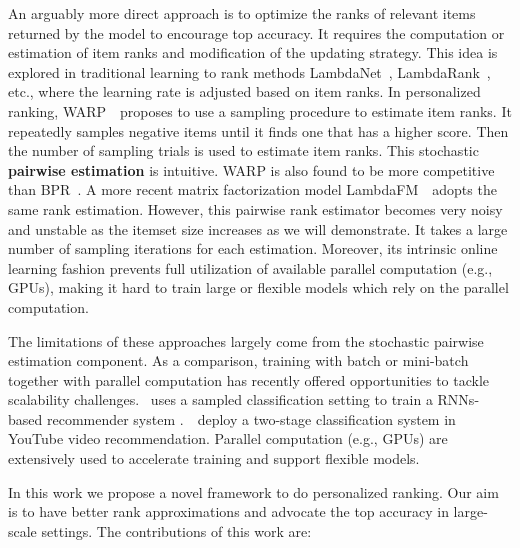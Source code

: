 \documentclass[letterpaper]{article}
\begin{document}
An arguably more direct approach is to optimize the ranks of relevant items returned by the model to encourage top accuracy. It requires the computation or estimation of item ranks and modification of the updating strategy. This idea is explored in traditional learning to rank methods LambdaNet~\cite{burges2005learning}, LambdaRank~\cite{burges2007learning}, etc., where the learning rate is adjusted based on item ranks. In personalized ranking, WARP~\cite{weston2010large}~proposes to use a sampling procedure to estimate item ranks. It repeatedly samples negative items until it finds one that has a higher score. Then the number of sampling trials is used to estimate item ranks. This stochastic \textbf{pairwise estimation} is intuitive. WARP is also found to be more competitive than BPR~\cite{hong2013co}. A more recent matrix factorization model LambdaFM~\cite{yuan2016lambdafm}~adopts the same rank estimation. However, this pairwise rank estimator becomes very noisy and unstable as the itemset size increases as we will demonstrate. It takes a large number of sampling iterations for each estimation. Moreover, its intrinsic online learning fashion prevents full utilization of available parallel computation (e.g., GPUs), making it hard to train large or flexible models which rely on the parallel computation.

The limitations of these approaches largely come from the stochastic pairwise estimation component. As a comparison, training with batch or mini-batch together with parallel computation has recently offered opportunities to tackle scalability challenges. \cite{hidasi2015session}~uses a sampled classification setting to train a RNNs-based recommender system .~\cite{covington2016deep}~deploy a two-stage classification system in YouTube video recommendation. Parallel computation (e.g., GPUs) are extensively used to accelerate training and support flexible models.%

In this work we propose a novel framework to do personalized ranking. Our aim is to have better rank approximations and advocate the top accuracy in large-scale settings. The contributions of this work are:
\end{document}
